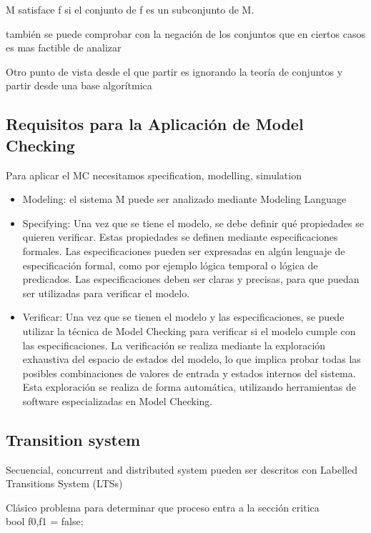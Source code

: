 M satisface f si el conjunto de f es un subconjunto de M.

también se puede comprobar con la negación de los conjuntos que en ciertos casos 
es mas factible de analizar 

Otro punto de vista desde el que partir es ignorando la teoría de conjuntos y 
partir desde una base algorítmica

\subsection{Requisitos para la Aplicación de Model Checking}

Para aplicar el MC necesitamos specification, modelling, simulation

\begin{itemize}
  \item Modeling: el sistema M puede ser analizado mediante Modeling Language
  \item Specifying: Una vez que se tiene el modelo, se debe definir qué propiedades se quieren verificar. Estas propiedades se definen mediante especificaciones formales. Las especificaciones pueden ser expresadas en algún lenguaje de especificación formal, como por ejemplo lógica temporal o lógica de predicados. Las especificaciones deben ser claras y precisas, para que puedan ser utilizadas para verificar el modelo.
  \item Verificar: Una vez que se tienen el modelo y las especificaciones, se puede utilizar la técnica de Model Checking para verificar si el modelo cumple con las especificaciones. La verificación se realiza mediante la exploración exhaustiva del espacio de estados del modelo, lo que implica probar todas las posibles combinaciones de valores de entrada y estados internos del sistema. Esta exploración se realiza de forma automática, utilizando herramientas de software especializadas en Model Checking.
\end{itemize}

\subsection{Transition system}
Secuencial, concurrent and distributed system pueden ser descritos con Labelled Transitions System (LTSs)

Clásico problema para determinar que proceso entra a la sección critica \\
bool  f0,f1 = false;\\

